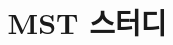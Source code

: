 \documentclass{beamer}
\title{MST 스터디}
\author{}
\date{\number\year년 \number\month월 \number\day일}
\begin{document}
\frame{\titlepage}



\end{document}
